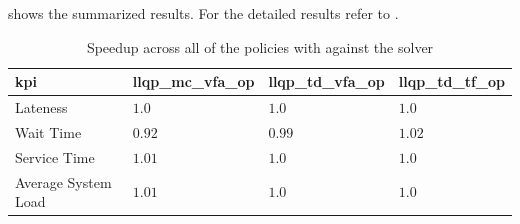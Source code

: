 \documentclass[draft=false]{seal_thesis}
\begin{document}
\begin{table}[!ht]
\centering
{}
\caption{Overview of developed  policies with }
\label{tab:rl_llqp_policies_overview}
\end{table}

 shows the summarized results. For the detailed results refer to .

\begin{table}[!ht]
\centering
\begin{tabular}{@{}llll@{}}
\toprule
\gls{kpi}                 & llqp\_mc\_vfa\_op & llqp\_td\_vfa\_op & llqp\_td\_tf\_op \\ \midrule
Lateness            & $1.0$                  & $1.0$                  & $1.0$                 \\
Wait Time           & $0.92$                  & $0.99$                  & $1.02$                 \\
Service Time        & $1.01$                  & $1.0$                  & $1.0$                 \\
Average System Load & $1.01$                  & $1.0$                  & $1.0$                 \\ \bottomrule
\end{tabular}
\caption{Speedup across all  of the  policies with  against the  solver}
\label{tab:rl_llqp_kpis_comp_gain}
\end{table}
\end{document}
